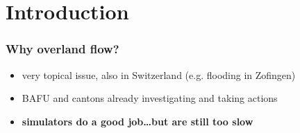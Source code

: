 \documentclass[xcolor=dvipsnames, USenglish]{beamer}  %
\begin{document}

\section{Introduction}
  \begin{frame}
    \frametitle{Why overland flow?}
    \begin{itemize}
      \item very topical issue, also in Switzerland (e.g. flooding in Zofingen)
      \item BAFU and cantons already investigating and taking actions
      \item \textbf{simulators do a good job\ldots but are still too slow}
    \end{itemize}


\end{frame}
\end{document}
